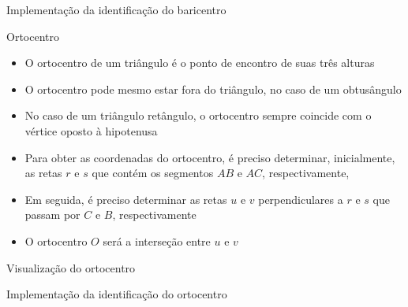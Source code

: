 \begin{frame}[fragile]{Implementação da identificação do baricentro}
\end{frame}

\begin{frame}[fragile]{Ortocentro}

    \begin{itemize}
        \item O ortocentro de um triângulo é o ponto de encontro de suas três alturas

        \item O ortocentro pode mesmo estar fora do triângulo, no caso de um obtusângulo

        \item No caso de um triângulo retângulo, o ortocentro sempre coincide com o vértice 
            oposto à hipotenusa

        \item Para obter as coordenadas do ortocentro, é preciso determinar, inicialmente,
            as retas $r$ e $s$ que contém os segmentos $AB$ e $AC$,
            respectivamente,

        \item Em seguida, é preciso determinar as retas $u$ e $v$ perpendiculares a 
            $r$ e $s$ que passam por $C$ e $B$, respectivamente

        \item O ortocentro $O$ será a interseção entre $u$ e $v$
    \end{itemize}

\end{frame}

\begin{frame}[fragile]{Visualização do ortocentro}

    \begin{figure}
        \centering

    \end{figure}

\end{frame}


\begin{frame}[fragile]{Implementação da identificação do ortocentro}
\end{frame}
